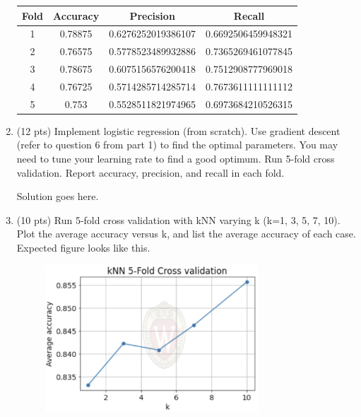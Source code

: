 \documentclass[a4paper]{article}
\theoremstyle{definition}
\newenvironment{soln}{
    \leavevmode\color{blue}\ignorespaces
}{}
\begin{document}
\begin{enumerate}
	      \begin{soln}
		      \begin{center}
			      \begin{tabular}{ c  c  c  c}
				      \hline
				      Fold & Accuracy & Precision          & Recall             \\ \hline
				      1    & 0.78875  & 0.6276252019386107 & 0.6692506459948321 \\
				      2    & 0.76575  & 0.5778523489932886 & 0.7365269461077845 \\
				      3    & 0.78675  & 0.6075156576200418 & 0.7512908777969018 \\
				      4    & 0.76725  & 0.5714285714285714 & 0.7673611111111112 \\
				      5    & 0.753    & 0.5528511821974965 & 0.6973684210526315 \\
				      \hline
			      \end{tabular}
		      \end{center}
	      \end{soln}


	\item (12 pts) Implement logistic regression (from scratch). Use gradient descent (refer to question 6 from part 1) to find the optimal parameters. You may need to tune your learning rate to find a good optimum. Run 5-fold cross validation. Report accuracy, precision, and recall in each fold.

	      \begin{soln}  Solution goes here. \end{soln}

	\item (10 pts) Run 5-fold cross validation with kNN varying k (k=1, 3, 5, 7, 10). Plot the average accuracy versus k, and list the average accuracy of each case. \\
	      Expected figure looks like this.
	      \begin{figure}[h]
		      \centering
		      \includegraphics[width=8cm]{knn.png}
	      \end{figure}


\end{enumerate}
\end{document}
